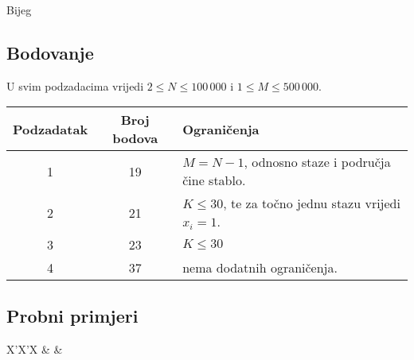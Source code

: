 \begin{statement}[
  problempoints=100,
  timelimit=2 sekunde,
  memorylimit=512 MiB,
]{Bijeg}
\subsection*{Bodovanje}

U svim podzadacima vrijedi $2 \le N \le 100\,000$ i $1 \le M \le 500\,000$.

{\renewcommand{\arraystretch}{1.4}
  \setlength{\tabcolsep}{6pt}
  \begin{tabular}{ccl}
   Podzadatak & Broj bodova & Ograničenja \\ \midrule
    1 & 19 & $M = N - 1$, odnosno staze i područja čine stablo. \\
    2 & 21 & $K \le 30$, te za točno jednu stazu vrijedi $x_i = 1$. \\
    3 & 23 & $K \le 30$ \\
    4 & 37 & nema dodatnih ograničenja.
\end{tabular}}

\subsection*{Probni primjeri}
\begin{tabularx}{\textwidth}{X'X'X}
 &
 &
\end{tabularx}

\end{statement}


